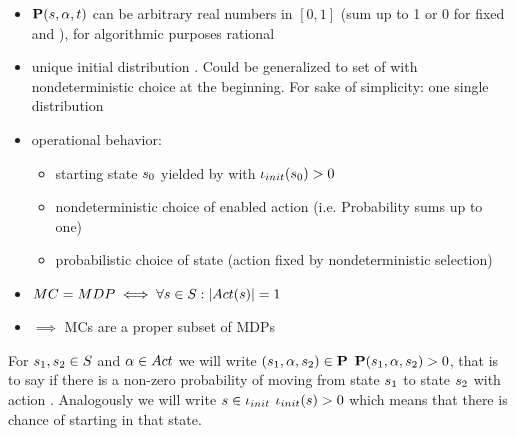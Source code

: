 \documentclass[preview]{standalone}
\begin{document}
	\begin{itemize}
		\item ${\textbf{P}}({s}, {\alpha}, t)$ can be arbitrary real numbers in $[0,1]$ (sum up to 1 or 0 for fixed \state and \action), for algorithmic purposes rational
		\item unique initial distribution \initdistrib. Could be generalized to set of \initdistrib with nondeterministic choice at the beginning. For sake of simplicity: one single distribution
		\item operational behavior:
		\begin{itemize}
			\item starting state ${s}_0$ yielded by \initdistrib with ${\iota_{init}}({s}_0) > 0$
			\item nondeterministic choice of enabled action (i.e. Probability sums up to one)
			\item probabilistic choice of state (action fixed by nondeterministic selection)
		\end{itemize}
		
		\item $MC = MDP \iff \forall {s} \in {S} : |{Act}({s})| = 1$
		
		\item $\implies$ MCs are a proper subset of MDPs
		
	\end{itemize}
	
	
	
	For ${s}_1, {s}_2 \in {S}$ and ${\alpha} \in {Act}$ we will write $({s}_1, {\alpha}, {s}_2) \in {\textbf{P}}$ \iffN ${\textbf{P}}({s}_1, {\alpha}, {s}_2) > 0$, that is to say if there is a non-zero probability of moving from state ${s}_1$ to state ${s}_2$ with action \action. Analogously we will write ${s} \in {\iota_{init}}$ \iffN ${\iota_{init}}({s}) > 0$ which means that there is chance of starting in that state.
	
	
	
\end{document}
